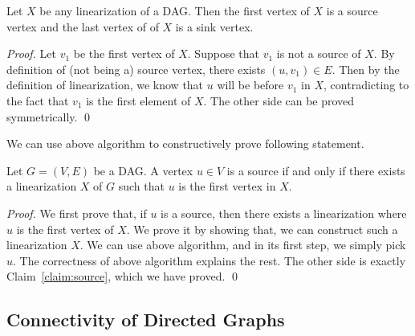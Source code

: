 \begin{claim}
Let $X$ be any linearization of a DAG. Then the first vertex of $X$ is a source vertex and 
the last vertex of of $X$ is a sink vertex.
\label{claim:source}
\end{claim}

\emph{Proof.} Let $v_1$ be the first vertex of $X$. Suppose that $v_1$ is not a source of $X$. 
By definition of (not being a) source vertex, there exists $(u,v_1)\in E$. Then by the definition
of linearization, we know that $u$ will be before $v_1$ in $X$, contradicting to the fact that
$v_1$ is the first element of $X$.
The other side can be proved symmetrically. \qed

We can use above algorithm to constructively prove following statement.

\begin{claim}
Let $G = (V, E)$ be a DAG. A vertex $u\in V$ is a source if and only if 
there exists a linearization $X$ of $G$ such that $u$ is the first vertex in $X$.
\end{claim}

\emph{Proof.} We first prove that, if $u$ is a source, then there exists a linearization
where $u$ is the first vertex of $X$. We prove it by showing that,
we can construct such a linearization $X$. We can use above algorithm,
and in its first step, we simply pick $u$. The correctness of above algorithm
explains the rest.  The other side is exactly Claim~\ref{claim:source}, which we have proved. \qed

\subsection*{Connectivity of Directed Graphs}

